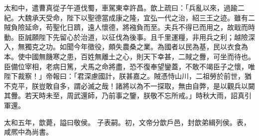 \begin{pinyinscope}
 
 
 
 太和中，遣曹真從子午道伐蜀，車駕東幸許昌。歆上疏曰：「兵亂以來，過踰二紀。大魏承天受命，陛下以聖德當成康之隆，宜弘一代之治，紹三王之迹。雖有二賊負險延命，苟聖化日躋，遠人懷德，將襁負而至。夫兵不得已而用之，故戢而時動。臣誠願陛下先留心於治道，以征伐為後事。且千里運糧，非用兵之利；越險深入，無獨克之功。如聞今年徵役，頗失農桑之業。為國者以民為基，民以衣食為本。使中國無饑寒之患，百姓無離土之心，則天下幸甚，二賊之釁，可坐而待也。臣備位宰相，老病日篤，犬馬之命將盡，恐不復奉望鑾蓋，不敢不竭臣子之懷，唯陛下裁察！」帝報曰：「君深慮國計，朕甚嘉之。賊憑恃山川，二祖勞於前世，猶不克平，朕豈敢自多，謂必滅之哉！諸將以為不一探取，無由自弊，是以觀兵以闚其釁。若天時未至，周武還師，乃前事之鑒，朕敬不忘所戒。」時秋大雨，詔真引軍還。
 
 
太和五年，歆薨，謚曰敬侯。
 子表嗣。初，文帝分歆戶邑，封歆弟緝列侯。表，咸熈中為尚書。
 
 
\end{pinyinscope}
